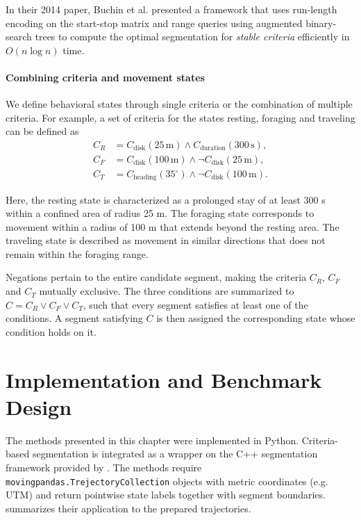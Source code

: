 In their 2014 paper, Buchin et al. presented a framework that uses run-length encoding on the start-stop matrix and range queries using augmented binary-
search trees to compute the optimal segmentation for \emph{stable criteria} efficiently in $O(n\log n)$ time.

\paragraph{Combining criteria and movement states}
We define behavioral states through single criteria or the combination of multiple criteria.
For example, a set of criteria for the states resting, foraging and traveling can be defined as 
\[
\begin{aligned}
C_R &=
C_{\mathrm{disk}}(25\,\mathrm m)
\land C_{\mathrm{duration}}(300\,\mathrm s),\\
C_F &=
C_{\mathrm{disk}}(100\,\mathrm m)
\land \neg C_{\mathrm{disk}}(25\,\mathrm m),\\
C_T &=
C_{\mathrm{heading}}(35^\circ)
\land \neg C_{\mathrm{disk}}(100\,\mathrm m).
\end{aligned}
\]

Here, the resting state is characterized as a prolonged stay of at least 300 s within a confined area of radius 25 m.
The foraging state corresponds to movement within a radius of 100 m that extends beyond the resting area. 
The traveling state is described as movement in similar directions that does not remain within the foraging range.

Negations pertain to the entire candidate segment, making the criteria $C_R$, $C_F$ and $C_T$ mutually exclusive.
The three conditions are summarized to $C = C_R \vee C_F \vee C_T$, such that every segment satisfies at least one of the conditions.
A segment satisfying $C$ is then assigned the corresponding state whose condition holds on it.
\section{Implementation and Benchmark Design}
\label{sec:seg-benchmark}
The methods presented in this chapter were implemented in Python. 
Criteria-based segmentation is integrated as a wrapper on the C++ segmentation framework provided by \cite{alewijnse2014segmentation}.
The methods require \texttt{movingpandas.TrejectoryCollection} objects with metric coordinates (e.g. UTM) and return pointwise state labels together with segment boundaries.
 summarizes their application to the prepared trajectories.

